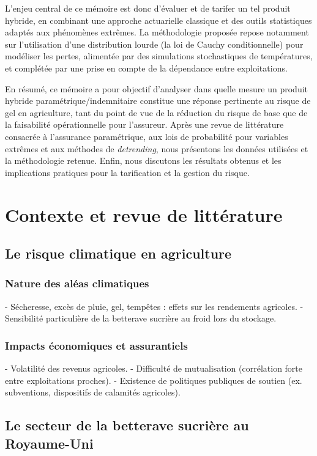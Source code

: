 \documentclass[11pt,a4paper,openright,twoside]{report}
\begin{document}
L’enjeu central de ce mémoire est donc d’évaluer et de tarifer un tel produit hybride, en combinant une approche actuarielle classique et des outils statistiques adaptés aux phénomènes extrêmes. La méthodologie proposée repose notamment sur l’utilisation d’une distribution lourde (la loi de Cauchy conditionnelle) pour modéliser les pertes, alimentée par des simulations stochastiques de températures, et complétée par une prise en compte de la dépendance entre exploitations.  

En résumé, ce mémoire a pour objectif d’analyser dans quelle mesure un produit hybride paramétrique/indemnitaire constitue une réponse pertinente au risque de gel en agriculture, tant du point de vue de la réduction du risque de base que de la faisabilité opérationnelle pour l’assureur. Après une revue de littérature consacrée à l’assurance paramétrique, aux lois de probabilité pour variables extrêmes et aux méthodes de \textit{detrending}, nous présentons les données utilisées et la méthodologie retenue. Enfin, nous discutons les résultats obtenus et les implications pratiques pour la tarification et la gestion du risque.

\chapter{Contexte et revue de littérature}

\section{Le risque climatique en agriculture}
\subsection{Nature des aléas climatiques}
- Sécheresse, excès de pluie, gel, tempêtes : effets sur les rendements agricoles.  
- Sensibilité particulière de la betterave sucrière au froid lors du stockage.  

\subsection{Impacts économiques et assurantiels}
- Volatilité des revenus agricoles.  
- Difficulté de mutualisation (corrélation forte entre exploitations proches).  
- Existence de politiques publiques de soutien (ex. subventions, dispositifs de calamités agricoles).  

\section{Le secteur de la betterave sucrière au Royaume-Uni}
\end{document}

